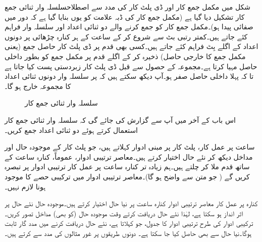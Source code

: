 شکل  میں مکمل جمع کار  اور ڈی پلٹ کار  کی مدد سے اصطلاح{سلسلہ وار ثنائی جمع کار} تشکیل دیا گیا ہے (مکمل جمع کار کی ڈبہ علامت کو یوں بنایا گیا ہے کہ دور میں صفائی پیدا ہو)۔مکمل جمع کار کو جمع کرنے والے دو ثنائی اعداد  اور  سلسلہ وار فراہم کئے جاتے ہیں۔کمتر رتبی بٹ سے شروع کر کے ساعت کے ہر کنارہ چڑھائی پر دونوں اعداد کے اگلے بِٹ فراہم کئے جاتے ہیں۔کسی بھی قدم پر ڈی پلٹ کار حاصل جمع (یعنی مکمل جمع کا خارجی حاصل) ذخیرہ کر کے اگلے قدم پر مکمل جمع کو بطور داخلی حاصل مہیا کرتا ہے۔مجموعہ کے حصول سے قبل ڈی پلٹ کار زبردستی پست کیا جاتا ہے تا کہ پہلا داخلی حاصل صفر ہو۔آپ دیکھ سکتے ہیں کہ  پر سلسلہ وار دونوں ثنائی اعداد کا مجموعہ خارج ہو گا۔ 
\begin{figure}
\centering
{}
\caption{سلسلہ وار ثنائی جمع کار}
\label{شکل_ترتیبی_ثنائی_سلسلہ_وار_جمع_کار}
\end{figure}

اس باب کے آخر میں آپ سے گزارش کی جائے گی کہ سلسلہ وار ثنائی جمع کار استعمال کرتے ہوئے دو ثنائی اعداد جمع کریں۔

ساعت پر عمل کار، پلٹ کار پر مبنی ادوار  کہلاتے ہیں، جو پلٹ کار کے موجودہ حال اور مداخل دیکھ کر نئے حال اختیار کرتے ہیں۔معاصر ترتیبی ادوار، عموماً، کنارہ ساعت کے ساتھ قدم ملا کر چلتے ہیں۔ہم زیادہ تر کنارہ ساعت پر عمل کار ترتیبی ادوار پر تبصرہ کریں گے ( جو متن سے واضح ہو گا)۔معاصر ترتیبی ادوار میں ترکیبی حصے کا موجود ہونا لازم نہیں۔

کنارہ پر عمل کار معاصر ترتیبی ادوار کنارہ ساعت پر نیا حال اختیار کرتے ہیں۔موجودہ حال نئے حال پر اثر انداز ہو سکتا ہے، لہٰذا نئے حال دریافت کرتے وقت موجودہ حال (کو بھی) مداخل تصور کریں۔ترکیبی ادوار کی طرح ترتیبی ادوار کا جدول، جو  کہلاتا ہے، نئے حال دریافت کرنے میں مدد گار ثابت ہوگا۔نیا حال  سے بھی حاصل کیا جا سکتا ہے۔ دونوں طریقوں پر غور مثالوں کی مدد سے کرتے ہیں۔

